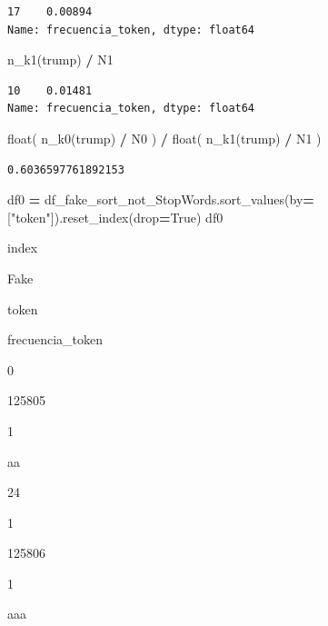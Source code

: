 \documentclass[
  11pt,
  a4paper,
]{article}
\newenvironment{Shaded}{\begin{snugshade}}{\end{snugshade}}
\newcommand{\BuiltInTok}[1]{#1}
\newcommand{\NormalTok}[1]{#1}
\newcommand{\OperatorTok}[1]{\textcolor[rgb]{0.81,0.36,0.00}{\textbf{#1}}}
\newcommand{\StringTok}[1]{\textcolor[rgb]{0.31,0.60,0.02}{#1}}
\newcommand{\VariableTok}[1]{\textcolor[rgb]{0.00,0.00,0.00}{#1}}
\begin{document}
\begin{verbatim}
17    0.00894
Name: frecuencia_token, dtype: float64
\end{verbatim}

\begin{Shaded}
\begin{Highlighting}[]
\NormalTok{n\_k1(}\StringTok{\textquotesingle{}trump\textquotesingle{}}\NormalTok{) }\OperatorTok{/}\NormalTok{ N1}
\end{Highlighting}
\end{Shaded}

\begin{verbatim}
10    0.01481
Name: frecuencia_token, dtype: float64
\end{verbatim}

\begin{Shaded}
\begin{Highlighting}[]
\BuiltInTok{float}\NormalTok{( n\_k0(}\StringTok{\textquotesingle{}trump\textquotesingle{}}\NormalTok{) }\OperatorTok{/}\NormalTok{ N0 ) }\OperatorTok{/} \BuiltInTok{float}\NormalTok{( n\_k1(}\StringTok{\textquotesingle{}trump\textquotesingle{}}\NormalTok{) }\OperatorTok{/}\NormalTok{ N1 )}
\end{Highlighting}
\end{Shaded}

\begin{verbatim}
0.6036597761892153
\end{verbatim}

\begin{Shaded}
\begin{Highlighting}[]
\NormalTok{df0 }\OperatorTok{=}\NormalTok{ df\_fake\_sort\_not\_StopWords.sort\_values(by}\OperatorTok{=}\NormalTok{[}\StringTok{"token"}\NormalTok{]).reset\_index(drop}\OperatorTok{=}\VariableTok{True}\NormalTok{)}
\NormalTok{df0}
\end{Highlighting}
\end{Shaded}

index

Fake

token

frecuencia\_token

0

125805

1

aa

24

1

125806

1

aaa
\end{document}
